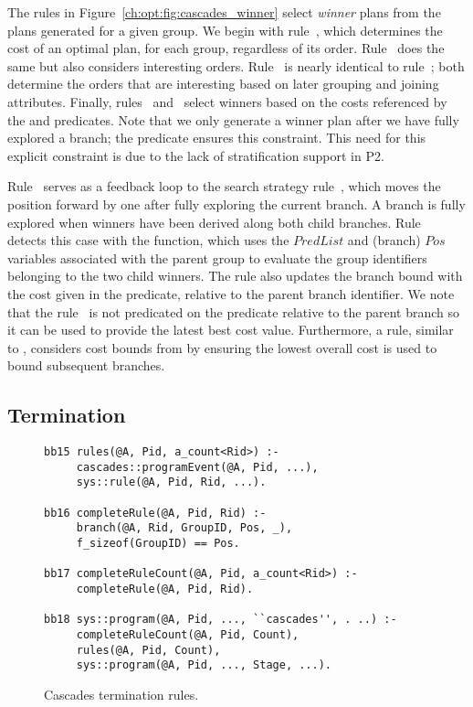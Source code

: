 The rules in Figure~\ref{ch:opt:fig:cascades_winner} select {\em winner} plans
from the plans generated for a given group.  We begin with rule~, which
determines the cost of an optimal plan, for each group, regardless of its
order.  Rule~ does the same but also considers interesting orders.
Rule~ is nearly identical to rule~; both determine the orders
that are interesting based on later grouping and joining attributes.  Finally,
rules~ and~ select winners based on the costs referenced by
the  and  predicates.  Note that we only
generate a winner plan after we have fully explored a branch; the  predicate ensures this constraint.  This need for this
explicit constraint is due to the lack of stratification support in P2.

Rule~ serves as a feedback loop to the search strategy rule~,
which moves the  position forward by one after fully exploring the
current branch.  A branch is fully explored when winners have been derived
along both child branches.  Rule~ detects this case with the
 function, which uses the $PredList$ and (branch)
$Pos$ variables associated with the parent group to evaluate the group
identifiers belonging to the two child winners.  The rule also updates the
branch bound with the cost given in the  predicate, relative
to the parent branch identifier.  We note that the rule~ is not
predicated on the  predicate relative to the parent branch so it can
be used to provide the latest best cost value.  Furthermore, a rule, similar to
, considers cost bounds from  by ensuring the lowest
overall cost is used to bound subsequent branches.

\subsection{Termination}
\label{ch:opt:sec:cascadesend}

\begin{figure*}
\ssp
\centering
\begin{lstlisting}
bb15 rules(@A, Pid, a_count<Rid>) :-
     cascades::programEvent(@A, Pid, ...),
     sys::rule(@A, Pid, Rid, ...).

bb16 completeRule(@A, Pid, Rid) :-
     branch(@A, Rid, GroupID, Pos, _),
     f_sizeof(GroupID) == Pos.

bb17 completeRuleCount(@A, Pid, a_count<Rid>) :-
     completeRule(@A, Pid, Rid).

bb18 sys::program(@A, Pid, ..., ``cascades'', . ..) :-
     completeRuleCount(@A, Pid, Count),
     rules(@A, Pid, Count),
     sys::program(@A, Pid, ..., Stage, ...).
\end{lstlisting}
\caption{\label{ch:opt:fig:cascadesend}Cascades termination rules.}
\end{figure*}

